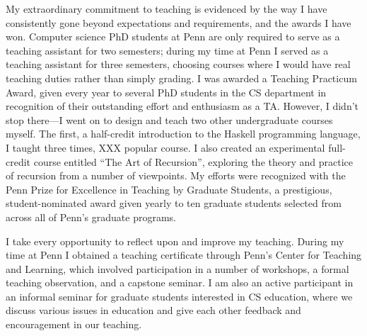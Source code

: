 \documentclass{article}
\begin{document}
My extraordinary commitment to teaching is evidenced by the way I have
consistently gone beyond expectations and requirements, and the awards
I have won.  Computer science PhD students at Penn are only required
to serve as a teaching assistant for two semesters; during my time at
Penn I served as a teaching assistant for three semesters, choosing
courses where I would have real teaching duties rather than simply
grading.  I was awarded a Teaching Practicum Award, given every year
to several PhD students in the CS department in recognition of their
outstanding effort and enthusiasm as a TA.  However, I didn't stop
there---I went on to design and teach two other undergraduate courses
myself. The first, a half-credit introduction to the Haskell
programming language, I taught three times, XXX popular course.  I
also created an experimental full-credit course entitled ``The Art of
Recursion'', exploring the theory and practice of recursion from a
number of viewpoints.  My efforts were recognized with the Penn Prize
for Excellence in Teaching by Graduate Students, a prestigious,
student-nominated award given yearly to ten graduate students selected
from across all of Penn's graduate programs.

I take every opportunity to reflect upon and improve my
teaching. During my time at Penn I obtained a teaching certificate
through Penn's Center for Teaching and Learning, which involved
participation in a number of workshops, a formal teaching observation,
and a capstone seminar.  I am also an active participant in an
informal seminar for graduate students interested in CS education,
where we discuss various issues in education and give each other
feedback and encouragement in our teaching.
\end{document}
